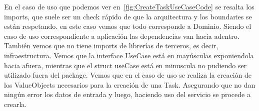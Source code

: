 En el caso de uso que podemos ver en~\cref{fig:CreateTaskUseCaseCode} se resalta los imports, que suele ser un check rápido de que la arquitectura y los boundaries se están respetando. en este caso vemos que todo corresponde a Dominio. Siendo el caso de uso correspondiente a aplicación las dependencias van hacia adentro. También vemos que no tiene imports de librerías de terceros, es decir, infraestructura. Vemos que la interface UseCase está en mayúsculas exponiendola hacia afuera, mientras que el struct useCase está en minuscula no pudiendo ser utilizado fuera del package. Vemos que en el caso de uso se realiza la creación de los ValueObjects necesarios para la creación de una Task. Asegurando que no dan ningún error los datos de entrada y luego, haciendo uso del servicio se procede a crearla.

\begin{figure}[H]
    \centering

\end{figure}
